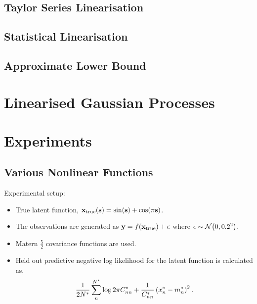 \documentclass{article} %
\begin{document}
\subsection{Taylor Series Linearisation}

\subsection{Statistical Linearisation}

\subsection{Approximate Lower Bound}


\section{Linearised Gaussian Processes}

\section{Experiments}


\subsection{Various Nonlinear Functions}

Experimental setup:
\begin{itemize}

    \item True latent function, $\mathbf{x}_{\text{true}}\!\left({\mathbf{s}}\right) =
        \sin\!\left({\mathbf{s}}\right) + \cos\!\left({\pi\mathbf{s}}\right)$.

    \item The observations are generated as $\mathbf{y} =
        f\!\left({{\mathbf{x}_\text{true}}}\right) + \epsilon$ where $\epsilon \sim \mathcal{N}\!\left({0,
            0.2^2}\right)$.
    
    \item Matern $\frac{5}{2}$ covariance functions are used. 

    \item Held out predictive negative log likelihood for the latent function
        is calculated as,
        \begin{equation}
            \frac{1}{2N^{*}} \sum^{N^{*}}_n \log{2\pi\ensuremath{C}\ensuremath{^{*}}_{nn}}
                + \frac{1}{C^{*}_{nn}} \left({x^{*}_n -
                    m^{*}_n}\right)^2.
        \end{equation}

\end{itemize}
\end{document}
